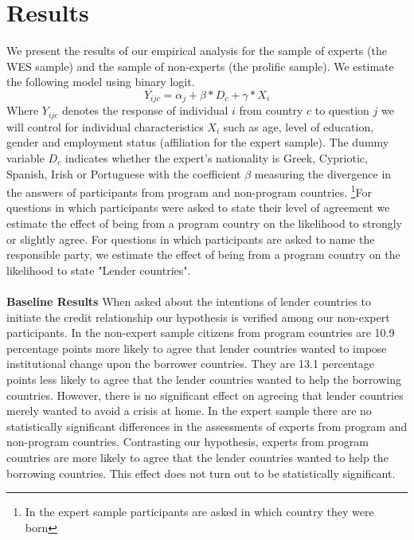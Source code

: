 \clearpage
\section{Results}
We present the results of our empirical analysis for the sample of experts (the WES sample) and the sample of non-experts (the prolific sample).  We estimate the following model using binary logit. 
\begin{equation*}
    Y_{ijc}= \alpha_{j}+ \beta *D_{c} + \gamma*X_{i}
\end{equation*}
Where $Y_{ijc}$ denotes the response of individual $i$ from country $c$ to question $j$ we will control for individual characteristics $X_{i}$ such as age, level of education, gender and employment status (affiliation for the expert sample). The dummy variable $D_{c}$ indicates whether the expert's nationality is Greek, Cypriotic, Spanish, Irish or Portuguese with the coefficient $\beta$ measuring the divergence in the answers of participants from program and non-program countries. \footnote{In the expert sample participants are asked in which country they were born}For questions in which participants were asked to state their level of agreement we estimate the effect of being from a program country on the likelihood to strongly or slightly agree. For questions in which participants are asked to name the responsible party, we estimate the effect of being from a program country on the likelihood to state "Lender countries". \\ \\
\textbf{Baseline Results} 
When asked about the intentions of lender countries to initiate the credit relationship our hypothesis is verified among our non-expert participants.
 In the non-expert sample citizens from program countries are 10.9 percentage points more likely to agree that lender countries wanted to impose institutional change upon the borrower countries. They are 13.1 percentage points less likely to agree that the lender countries wanted to help the borrowing countries. However, there is no significant effect on agreeing that lender countries merely wanted to avoid a crisis at home. In the expert sample there are no statistically significant differences in the assessments of experts from program and non-program countries. Contrasting our hypothesis,  experts from program countries are more likely to agree that the lender countries wanted to help the borrowing countries. This effect does not turn out to be statistically significant.  \\ 
